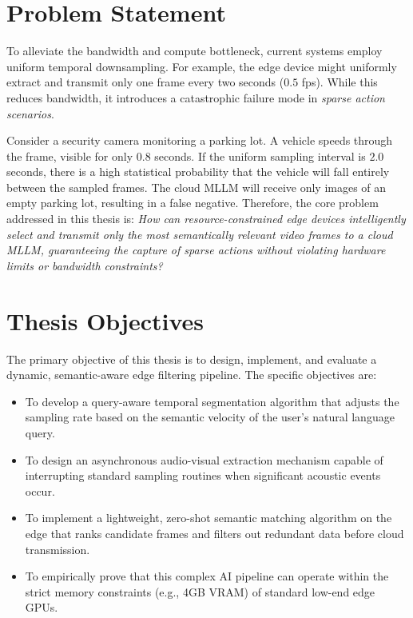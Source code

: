 \documentclass[12pt, a4paper]{report}
\begin{document}
\section{Problem Statement}
To alleviate the bandwidth and compute bottleneck, current systems employ uniform temporal downsampling. For example, the edge device might uniformly extract and transmit only one frame every two seconds ($0.5$ fps). While this reduces bandwidth, it introduces a catastrophic failure mode in \textit{sparse action scenarios}. 

Consider a security camera monitoring a parking lot. A vehicle speeds through the frame, visible for only $0.8$ seconds. If the uniform sampling interval is $2.0$ seconds, there is a high statistical probability that the vehicle will fall entirely between the sampled frames. The cloud MLLM will receive only images of an empty parking lot, resulting in a false negative. Therefore, the core problem addressed in this thesis is: \textit{How can resource-constrained edge devices intelligently select and transmit only the most semantically relevant video frames to a cloud MLLM, guaranteeing the capture of sparse actions without violating hardware limits or bandwidth constraints?}

\section{Thesis Objectives}
The primary objective of this thesis is to design, implement, and evaluate a dynamic, semantic-aware edge filtering pipeline. The specific objectives are:
\begin{itemize}
    \item To develop a query-aware temporal segmentation algorithm that adjusts the sampling rate based on the semantic velocity of the user's natural language query.
    \item To design an asynchronous audio-visual extraction mechanism capable of interrupting standard sampling routines when significant acoustic events occur.
    \item To implement a lightweight, zero-shot semantic matching algorithm on the edge that ranks candidate frames and filters out redundant data before cloud transmission.
    \item To empirically prove that this complex AI pipeline can operate within the strict memory constraints (e.g., 4GB VRAM) of standard low-end edge GPUs.
\end{itemize}
\end{document}
